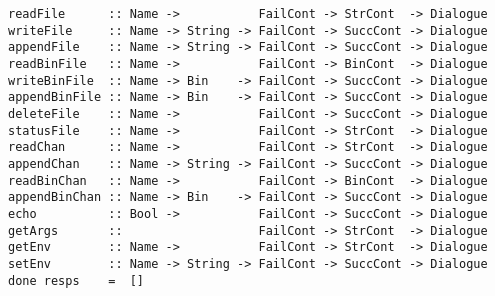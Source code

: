 \mbox{\tt readFile\ \ \ \ \ \ ::\ Name\ ->\ \ \ \ \ \ \ \ \ \ \ FailCont\ ->\ StrCont\ \ ->\ Dialogue}\\
\mbox{\tt writeFile\ \ \ \ \ ::\ Name\ ->\ String\ ->\ FailCont\ ->\ SuccCont\ ->\ Dialogue}\\
\mbox{\tt appendFile\ \ \ \ ::\ Name\ ->\ String\ ->\ FailCont\ ->\ SuccCont\ ->\ Dialogue}\\
\mbox{\tt readBinFile\ \ \ ::\ Name\ ->\ \ \ \ \ \ \ \ \ \ \ FailCont\ ->\ BinCont\ \ ->\ Dialogue}\\
\mbox{\tt writeBinFile\ \ ::\ Name\ ->\ Bin\ \ \ \ ->\ FailCont\ ->\ SuccCont\ ->\ Dialogue}\\
\mbox{\tt appendBinFile\ ::\ Name\ ->\ Bin\ \ \ \ ->\ FailCont\ ->\ SuccCont\ ->\ Dialogue}\\
\mbox{\tt deleteFile\ \ \ \ ::\ Name\ ->\ \ \ \ \ \ \ \ \ \ \ FailCont\ ->\ SuccCont\ ->\ Dialogue}\\
\mbox{\tt statusFile\ \ \ \ ::\ Name\ ->\ \ \ \ \ \ \ \ \ \ \ FailCont\ ->\ StrCont\ \ ->\ Dialogue}\\
\mbox{\tt readChan\ \ \ \ \ \ ::\ Name\ ->\ \ \ \ \ \ \ \ \ \ \ FailCont\ ->\ StrCont\ \ ->\ Dialogue}\\
\mbox{\tt appendChan\ \ \ \ ::\ Name\ ->\ String\ ->\ FailCont\ ->\ SuccCont\ ->\ Dialogue}\\
\mbox{\tt readBinChan\ \ \ ::\ Name\ ->\ \ \ \ \ \ \ \ \ \ \ FailCont\ ->\ BinCont\ \ ->\ Dialogue}\\
\mbox{\tt appendBinChan\ ::\ Name\ ->\ Bin\ \ \ \ ->\ FailCont\ ->\ SuccCont\ ->\ Dialogue}\\
\mbox{\tt echo\ \ \ \ \ \ \ \ \ \ ::\ Bool\ ->\ \ \ \ \ \ \ \ \ \ \ FailCont\ ->\ SuccCont\ ->\ Dialogue}\\
\mbox{\tt getArgs\ \ \ \ \ \ \ ::\ \ \ \ \ \ \ \ \ \ \ \ \ \ \ \ \ \ \ FailCont\ ->\ StrCont\ \ ->\ Dialogue}\\
\mbox{\tt getEnv\ \ \ \ \ \ \ \ ::\ Name\ ->\ \ \ \ \ \ \ \ \ \ \ FailCont\ ->\ StrCont\ \ ->\ Dialogue}\\
\mbox{\tt setEnv\ \ \ \ \ \ \ \ ::\ Name\ ->\ String\ ->\ FailCont\ ->\ SuccCont\ ->\ Dialogue}
%
%
%
%
%
%
%
%
%
%
%
%
%
%
%
%
%
\eprogB\noindent\bprogB
\mbox{\tt done\ resps\ \ \ \ =\ \ []}
